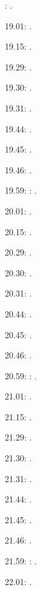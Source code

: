\label{key}\documentclass[italian]{article}
\begin{document}
:    .

19.01:     . 

19.15:     . 

19.29:     . 

19.30:     .

19.31:     .

19.44:     .

19.45:     .

19.46:     .

19.59:     
:    .

20.01:     . 

20.15:     . 

20.29:     . 

20.30:     .

20.31:     .

20.44:     .

20.45:     .

20.46:     .

20.59:     
:    .

21.01:     . 

21.15:     . 

21.29:     . 

21.30:     .

21.31:     .

21.44:     .

21.45:     .

21.46:     .

21.59:     
:    .

22.01:     . 
\end{document}
